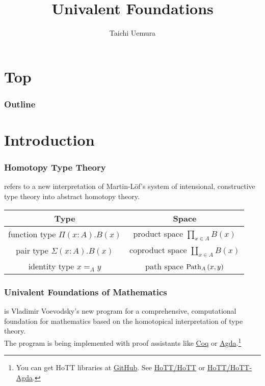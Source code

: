 \documentclass[dvipdfmx]{beamer}
\title{Univalent Foundations}
\author{Taichi Uemura}
\begin{document}
\section{Top}

\begin{frame}
  \titlepage
\end{frame}

\begin{frame}
  \frametitle{Outline}
  \tableofcontents
\end{frame}

\section{Introduction}

\begin{frame}
  \frametitle{Homotopy Type Theory}
  refers to a new interpretation of Martin-L\"of's system of
  intensional, constructive type theory into
  abstract homotopy theory.\cite{hottbook}

  \begin{center}
    \begin{tabular}{cc}
      \toprule
      Type & Space \\
      \midrule
      function type
      $\Pi \left( x : A \right) . B \left( x \right)$
      & product space
      $\prod _{x \in A} B \left( x \right)$ \\
      pair type
      $\Sigma \left( x : A \right) . B \left( x \right)$
      & coproduct space
      $\coprod _{x \in A} B \left( x \right)$ \\
      identity type
      $x =_A y$
      & path space
      ${\rm Path}_A\left( x , y \right)$ \\
      \bottomrule
    \end{tabular}
  \end{center}
\end{frame}

\begin{frame}
  \frametitle{Univalent Foundations of Mathematics}
  is Vladimir Voevodsky's new program
  for a comprehensive, computational foundation for mathematics
  based on the homotopical interpretation of type theory.
  \\
  The program is being implemented with proof assistants
  like \href{https://coq.inria.fr/}{Coq}
  or \href{http://wiki.portal.chalmers.se/agda/pmwiki.php}{Agda}.\footnote{
    You can get HoTT libraries at \href{https://github.com/}{GitHub}.
    See \href{https://github.com/HoTT/HoTT}{HoTT/HoTT}
    or \href{https://github.com/HoTT/HoTT-Agda}{HoTT/HoTT-Agda}.
  }
\end{frame}
\end{document}

